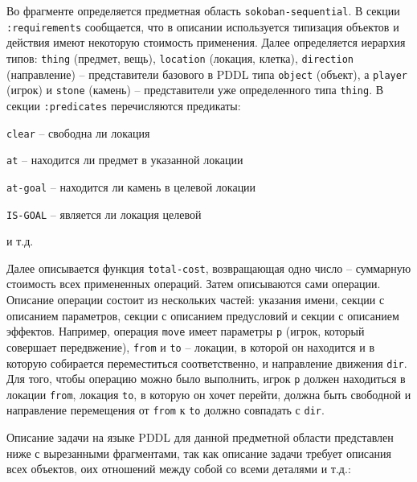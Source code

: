     Во фрагменте определяется предметная область \texttt{sokoban-sequential}. В секции \texttt{:requirements} сообщается, что в описании используется типизация объектов и действия имеют некоторую стоимость применения. Далее определяется иерархия типов: 
    \texttt{thing} (предмет, вещь), \texttt{location} (локация, клетка), \texttt{direction} (направление) -- представители базового в PDDL типа \texttt{object} (объект), а \texttt{player} (игрок) и \texttt{stone} (камень) -- представители уже определенного типа \texttt{thing}. 
    В секции \texttt{:predicates} перечисляются предикаты:
\begin{compactlist}
    \item \texttt{clear}  -- свободна ли локация
    \item \texttt{at}     -- находится ли предмет в указанной локации
    \item \texttt{at-goal} -- находится ли камень в целевой локации
    \item \texttt{IS-GOAL} -- является ли локация целевой
    \item и т.д.
\end{compactlist}
    Далее описывается функция \texttt{total-cost}, возвращающая одно число -- суммарную стоимость всех примененных операций.
    Затем описываются сами операции. Описание операции состоит из нескольких частей: указания имени,  секции с описанием параметров, секции с описанием предусловий и секции с описанием эффектов. Например, операция \texttt{move} имеет параметры \texttt{p} (игрок, который совершает передвжение), \texttt{from} и \texttt{to} -- локации, в которой он находится и в которую собирается переместиться соответственно, и направление движения \texttt{dir}. Для того, чтобы операцию можно было выполнить, игрок \texttt{p} должен находиться в локации \texttt{from}, локация \texttt{to}, в которую он хочет перейти, должна быть свободной и направление перемещения от \texttt{from} к \texttt{to} должно совпадать с \texttt{dir}.
    
    Описание задачи на языке PDDL для данной предметной области представлен ниже с вырезанными фрагментами, так как описание задачи требует описания всех объектов, оих отношений между собой со всеми деталями и т.д.:
  

